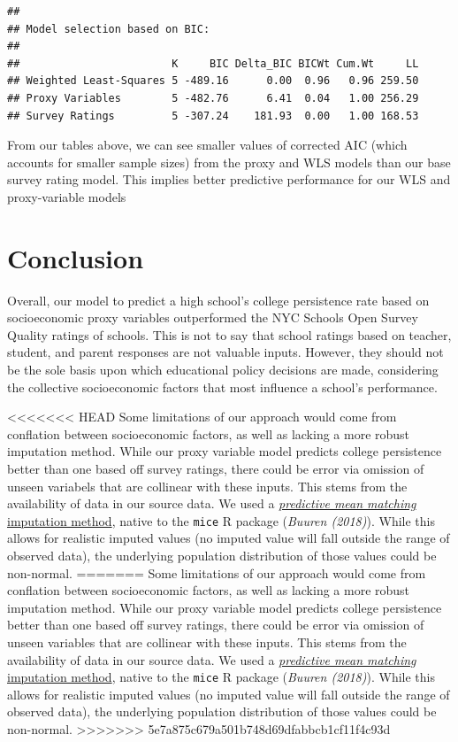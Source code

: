 \documentclass[
  man,floatsintext]{apa6}
\begin{document}
\begin{verbatim}
## 
## Model selection based on BIC:
## 
##                        K     BIC Delta_BIC BICWt Cum.Wt     LL
## Weighted Least-Squares 5 -489.16      0.00  0.96   0.96 259.50
## Proxy Variables        5 -482.76      6.41  0.04   1.00 256.29
## Survey Ratings         5 -307.24    181.93  0.00   1.00 168.53
\end{verbatim}

From our tables above, we can see smaller values of corrected AIC (which accounts for smaller sample sizes) from the proxy and WLS models than our base survey rating model. This implies better predictive performance for our WLS and proxy-variable models

\hypertarget{conclusion}{%
\section{Conclusion}\label{conclusion}}

Overall, our model to predict a high school's college persistence rate based on socioeconomic proxy variables outperformed the NYC Schools Open Survey Quality ratings of schools. This is not to say that school ratings based on teacher, student, and parent responses are not valuable inputs. However, they should not be the sole basis upon which educational policy decisions are made, considering the collective socioeconomic factors that most influence a school's performance.

<<<<<<< HEAD
Some limitations of our approach would come from conflation between socioeconomic factors, as well as lacking a more robust imputation method. While our proxy variable model predicts college persistence better than one based off survey ratings, there could be error via omission of unseen variabels that are collinear with these inputs. This stems from the availability of data in our source data. We used a \href{https://stefvanbuuren.name/fimd/sec-pmm.html}{\emph{predictive mean matching} imputation method}, native to the \texttt{mice} R package (\emph{Buuren (2018)}). While this allows for realistic imputed values (no imputed value will fall outside the range of observed data), the underlying population distribution of those values could be non-normal.
=======
Some limitations of our approach would come from conflation between socioeconomic factors, as well as lacking a more robust imputation method. While our proxy variable model predicts college persistence better than one based off survey ratings, there could be error via omission of unseen variables that are collinear with these inputs. This stems from the availability of data in our source data. We used a \href{https://stefvanbuuren.name/fimd/sec-pmm.html}{\emph{predictive mean matching} imputation method}, native to the \texttt{mice} R package (\emph{Buuren (2018)}). While this allows for realistic imputed values (no imputed value will fall outside the range of observed data), the underlying population distribution of those values could be non-normal.
>>>>>>> 5e7a875c679a501b748d69dfabbcb1cf11f4c93d
\end{document}
